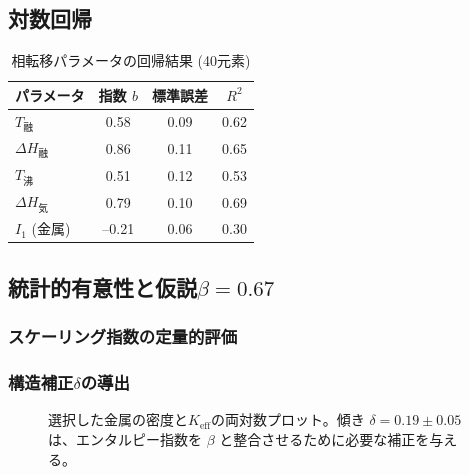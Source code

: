 \documentclass[11pt,a4paper]{article}
\newcommand{\Keff}{K_{\mathrm{eff}}}
\begin{document}
	\subsection{対数回帰}
	\begin{table}[htbp]
		\centering
		\caption{相転移パラメータの回帰結果 (40元素)}
		\label{tab:regression}
		\begin{tabular}{@{}lccc@{}}
			\toprule
			\textbf{パラメータ} & \textbf{指数 }\(b\) & \textbf{標準誤差} & \textbf{\(R^2\)} \\
			\midrule
			\(T_{\text{融}}\)   & 0.58 & 0.09 & 0.62 \\
			\(\Delta H_{\text{融}}\) & 0.86 & 0.11 & 0.65 \\
			\(T_{\text{沸}}\)   & 0.51 & 0.12 & 0.53 \\
			\(\Delta H_{\text{気}}\) & 0.79 & 0.10 & 0.69 \\
			\(I_1\) (金属)      & --0.21 & 0.06 & 0.30 \\
			\bottomrule
		\end{tabular}
	\end{table}
	
	\subsection{統計的有意性と仮説\(\beta = 0.67\)}
	\subsubsection{スケーリング指数の定量的評価}
	\subsubsection{構造補正\(\delta\)の導出}
	
	\begin{figure}[htbp]
		\centering
		\caption{選択した金属の密度と\(\Keff\)の両対数プロット。傾き \(\delta = 0.19 \pm 0.05\) は、エンタルピー指数を \(\beta\) と整合させるために必要な補正を与える。}
		\label{fig:density_scaling}
	\end{figure}
	
\end{document}
